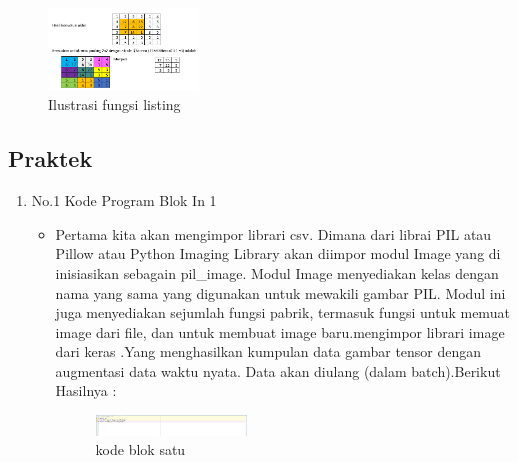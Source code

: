 \begin{enumerate}
        \begin{figure}[H]
            \includegraphics[width=4cm]{figures/1174039/chapter7/13.png}
            \centering
            \caption{Ilustrasi fungsi listing}
        \end{figure}
    \end{enumerate}
    \subsection{Praktek}
        \begin{enumerate}
        \item {No.1 Kode Program Blok In 1}
        \begin{itemize}
        \item Pertama kita akan mengimpor librari csv. Dimana dari librai PIL atau Pillow atau Python Imaging Library akan diimpor modul Image yang di inisiasikan sebagain pil\_image. Modul Image menyediakan kelas dengan nama yang sama yang digunakan untuk mewakili gambar PIL. Modul ini juga menyediakan sejumlah fungsi pabrik, termasuk fungsi untuk memuat image dari file, dan untuk membuat image baru.mengimpor librari image dari keras .Yang menghasilkan kumpulan data gambar tensor dengan augmentasi data waktu nyata. Data akan diulang (dalam batch).Berikut Hasilnya :
        \begin{figure}[H]
            \includegraphics[width=4cm]{figures/1174039/chapter7/praktek1.jpg}
            \centering
            \caption{kode blok satu}
        \end{figure}
        

\end{itemize}
\end{enumerate}
